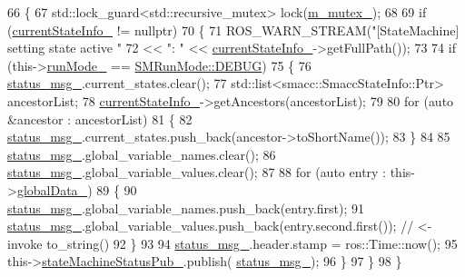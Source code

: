\begin{DoxyCode}
66 \{
67     std::lock\_guard<std::recursive\_mutex> lock(\hyperlink{classsmacc_1_1ISmaccStateMachine_aac785541646e5c517273bf31072505a1}{m\_mutex\_});
68 
69     \textcolor{keywordflow}{if} (\hyperlink{classsmacc_1_1ISmaccStateMachine_ac8ac420db18ed72cc0c7535f16c0aae8}{currentStateInfo\_} != \textcolor{keyword}{nullptr})
70     \{
71         ROS\_WARN\_STREAM(\textcolor{stringliteral}{"[StateMachine] setting state active "}
72                         << \textcolor{stringliteral}{": "} << \hyperlink{classsmacc_1_1ISmaccStateMachine_ac8ac420db18ed72cc0c7535f16c0aae8}{currentStateInfo\_}->getFullPath());
73 
74         \textcolor{keywordflow}{if} (this->\hyperlink{classsmacc_1_1ISmaccStateMachine_a9f8cfbf577f7ae7a48b7a328e2e6b589}{runMode\_} == \hyperlink{namespacesmacc_a3e4f79486ea6ea6342dd3c712d16a4f6adc30ec20708ef7b0f641ef78b7880a15}{SMRunMode::DEBUG})
75         \{
76             \hyperlink{classsmacc_1_1ISmaccStateMachine_a4f47dd614f12a95e7a3c46d465ce4b13}{status\_msg\_}.current\_states.clear();
77             std::list<smacc::SmaccStateInfo::Ptr> ancestorList;
78             \hyperlink{classsmacc_1_1ISmaccStateMachine_ac8ac420db18ed72cc0c7535f16c0aae8}{currentStateInfo\_}->getAncestors(ancestorList);
79 
80             \textcolor{keywordflow}{for} (\textcolor{keyword}{auto} &ancestor : ancestorList)
81             \{
82                 \hyperlink{classsmacc_1_1ISmaccStateMachine_a4f47dd614f12a95e7a3c46d465ce4b13}{status\_msg\_}.current\_states.push\_back(ancestor->toShortName());
83             \}
84 
85             \hyperlink{classsmacc_1_1ISmaccStateMachine_a4f47dd614f12a95e7a3c46d465ce4b13}{status\_msg\_}.global\_variable\_names.clear();
86             \hyperlink{classsmacc_1_1ISmaccStateMachine_a4f47dd614f12a95e7a3c46d465ce4b13}{status\_msg\_}.global\_variable\_values.clear();
87 
88             \textcolor{keywordflow}{for} (\textcolor{keyword}{auto} entry : this->\hyperlink{classsmacc_1_1ISmaccStateMachine_ad2f9dae184ea942db632ac4532a10a91}{globalData\_})
89             \{
90                 \hyperlink{classsmacc_1_1ISmaccStateMachine_a4f47dd614f12a95e7a3c46d465ce4b13}{status\_msg\_}.global\_variable\_names.push\_back(entry.first);
91                 \hyperlink{classsmacc_1_1ISmaccStateMachine_a4f47dd614f12a95e7a3c46d465ce4b13}{status\_msg\_}.global\_variable\_values.push\_back(entry.second.first()); \textcolor{comment}{// <- invoke
       to\_string()}
92             \}
93 
94             \hyperlink{classsmacc_1_1ISmaccStateMachine_a4f47dd614f12a95e7a3c46d465ce4b13}{status\_msg\_}.header.stamp = ros::Time::now();
95             this->\hyperlink{classsmacc_1_1ISmaccStateMachine_a55a7c7b26ad4dfea441c62c6326a5414}{stateMachineStatusPub\_}.publish(
      \hyperlink{classsmacc_1_1ISmaccStateMachine_a4f47dd614f12a95e7a3c46d465ce4b13}{status\_msg\_});
96         \}
97     \}
98 \}
\end{DoxyCode}


